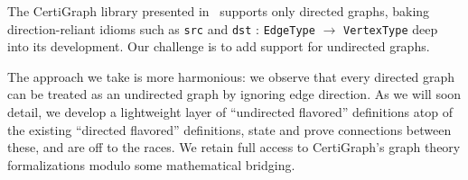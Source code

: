 The CertiGraph library presented in~\cite{DBLP:journals/pacmpl/WangCMH19} 
supports only directed graphs, baking direction-reliant 
idioms 
such as 
\texttt{src} and \texttt{dst} : \texttt{EdgeType} $\rightarrow$ \texttt{VertexType}
deep into its development.
Our challenge is to add support for undirected graphs. 


The approach we take is more harmonious: 
we observe that every directed graph can be treated as an undirected 
graph by ignoring edge direction.
As we will soon detail, we develop a lightweight layer of 
``undirected flavored'' definitions atop of the existing 
``directed flavored'' definitions, state and prove connections 
between these, and are off to the races. 
We retain full access to CertiGraph's graph theory formalizations 
modulo some mathematical bridging.




